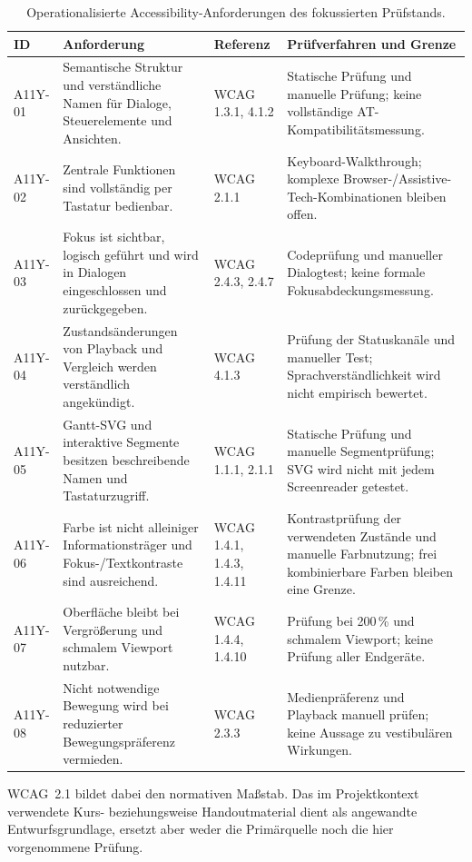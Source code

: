 \begin{table}[H]
\centering
\caption{Operationalisierte Accessibility-Anforderungen des fokussierten Prüfstands.}
\small
\begin{tabular}{p{}p{}p{}p{}}
\textbf{ID} & \textbf{Anforderung} & \textbf{Referenz} & \textbf{Prüfverfahren und Grenze} \\
\hline
A11Y-01 & Semantische Struktur und verständliche Namen für Dialoge, Steuerelemente und Ansichten. & WCAG 1.3.1, 4.1.2 & Statische Prüfung und manuelle Prüfung; keine vollständige AT-Kompatibilitätsmessung. \\
A11Y-02 & Zentrale Funktionen sind vollständig per Tastatur bedienbar. & WCAG 2.1.1 & Keyboard-Walkthrough; komplexe Browser-/Assistive-Tech-Kombinationen bleiben offen. \\
A11Y-03 & Fokus ist sichtbar, logisch geführt und wird in Dialogen eingeschlossen und zurückgegeben. & WCAG 2.4.3, 2.4.7 & Codeprüfung und manueller Dialogtest; keine formale Fokusabdeckungsmessung. \\
A11Y-04 & Zustandsänderungen von Playback und Vergleich werden verständlich angekündigt. & WCAG 4.1.3 & Prüfung der Statuskanäle und manueller Test; Sprachverständlichkeit wird nicht empirisch bewertet. \\
A11Y-05 & Gantt-SVG und interaktive Segmente besitzen beschreibende Namen und Tastaturzugriff. & WCAG 1.1.1, 2.1.1 & Statische Prüfung und manuelle Segmentprüfung; SVG wird nicht mit jedem Screenreader getestet. \\
A11Y-06 & Farbe ist nicht alleiniger Informationsträger und Fokus-/Textkontraste sind ausreichend. & WCAG 1.4.1, 1.4.3, 1.4.11 & Kontrastprüfung der verwendeten Zustände und manuelle Farbnutzung; frei kombinierbare Farben bleiben eine Grenze. \\
A11Y-07 & Oberfläche bleibt bei Vergrößerung und schmalem Viewport nutzbar. & WCAG 1.4.4, 1.4.10 & Prüfung bei 200\,\% und schmalem Viewport; keine Prüfung aller Endgeräte. \\
A11Y-08 & Nicht notwendige Bewegung wird bei reduzierter Bewegungspräferenz vermieden. & WCAG 2.3.3 & Medienpräferenz und Playback manuell prüfen; keine Aussage zu vestibulären Wirkungen. \\
\end{tabular}
\end{table}

WCAG~2.1 bildet dabei den normativen Maßstab. Das im Projektkontext verwendete Kurs- beziehungsweise Handoutmaterial dient als angewandte Entwurfsgrundlage, ersetzt aber weder die Primärquelle noch die hier vorgenommene Prüfung.

